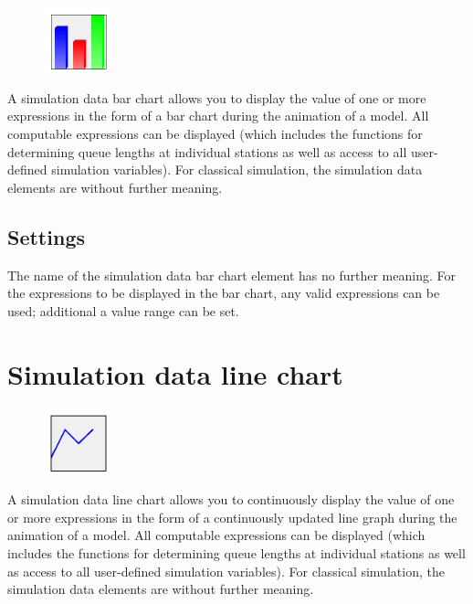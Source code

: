 \begin{figure}
\vspace{-22pt}
\includegraphics[width=2cm]{imageModelElementAnimationBarChart.png}
\vspace{-22pt}
\end{figure}

A simulation data bar chart allows you to display the value of one or more expressions
in the form of a bar chart during the animation of a model.
All computable expressions can be displayed (which includes the functions for determining queue
lengths at individual stations as well as access to all user-defined simulation variables).
For classical simulation, the simulation data elements are without further meaning.

\subsection*{Settings}

The name of the simulation data bar chart element has no further meaning.
For the expressions to be displayed in the bar chart, any valid expressions can be used;
additional a value range can be set.


\section{Simulation data line chart}
\label{ref:ModelElementAnimationDiagram}

\begin{figure}
\vspace{-22pt}
\includegraphics[width=2cm]{imageModelElementAnimationDiagram.png}
\vspace{-22pt}
\end{figure}

A simulation data line chart allows you to continuously display the value of one or more expressions
in the form of a continuously updated line graph during the animation of a model.
All computable expressions can be displayed (which includes the functions for determining queue
lengths at individual stations as well as access to all user-defined simulation variables).
For classical simulation, the simulation data elements are without further meaning.

